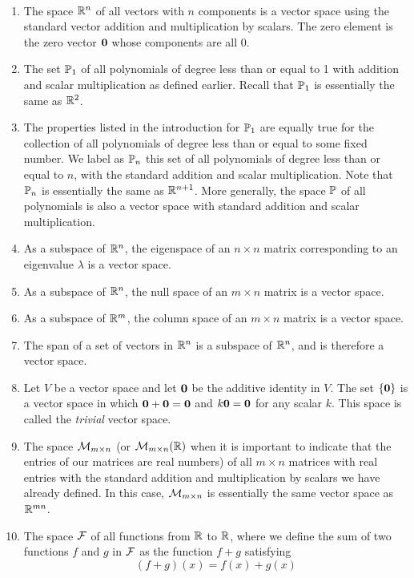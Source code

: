 \begin{example} ~
\begin{enumerate}
\item The space $\mathbb{R}^n$ of all vectors with $n$ components is a vector space using the standard vector addition and multiplication by scalars. The zero element is the zero vector $\mathbf{0}$ whose components are all 0.
\item The set $\mathbb{P}_1$ of all polynomials of degree less than or equal to 1 with addition and scalar multiplication as defined earlier. Recall that $\mathbb{P}_1$ is essentially the same as $\mathbb{R}^2$.
\item The properties listed in the introduction for $\mathbb{P}_1$ are equally true for the collection of all polynomials of degree less than or equal to some fixed number. We label as $\mathbb{P}_n$ this set of all polynomials of degree less than or equal to $n$, with the standard addition and scalar multiplication. Note that $\mathbb{P}_n$ is essentially the same as $\mathbb{R}^{n+1}$. More generally, the space $\mathbb{P}$ of all polynomials is also a vector space with standard addition and scalar multiplication.
\item As a subspace of $\mathbb{R}^n$, the eigenspace of an $n \times n$ matrix corresponding to an eigenvalue $\lambda$ is a vector space.
\item As a subspace of $\mathbb{R}^n$, the null space of an $m \times n$ matrix is a vector space.
\item As a subspace of $\mathbb{R}^m$, the column space of an $m \times n$ matrix is a vector space.
\item The span of a set of vectors in $\mathbb{R}^n$ is a subspace of $\mathbb{R}^n$, and is therefore a vector space. 
\item Let $V$ be a vector space and let $\mathbf{0}$ be the additive identity in $V$. The set $\{\mathbf{0}\}$ is a vector space in which $\mathbf{0} + \mathbf{0} = \mathbf{0}$ and $k\mathbf{0} = \mathbf{0}$ for any scalar $k$. This space is called the \emph{trivial} vector space. 
\item The space $\mathcal{M}_{m \times n}$ (or $\mathcal{M}_{m \times n}(\mathbb{R})$ when it is important to indicate that the entries of our matrices are real numbers) of all $m \times n$ matrices with real entries with the standard addition and multiplication by scalars we have already defined. In this case, $\mathcal{M}_{m \times n}$ is essentially the same vector space as $\mathbb{R}^{mn}$.
\item The space $\mathcal{F}$ of all functions from $\mathbb{R}$ to $\mathbb{R}$, where we define the sum of two functions $f$ and $g$ in $\mathcal{F}$ as the function $f+g$ satisfying
\[(f+g)(x) = f(x) + g(x)\]

\end{enumerate}
\end{example}
